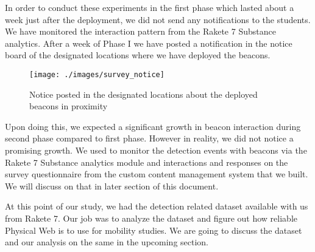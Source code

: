 In order to conduct these experiments in the first phase which lasted about a week just after the deployment, we did not send any notifications to the students. We have monitored the interaction pattern from the Rakete 7 Substance\cite{Rakete7Substance} analytics.
After a week of Phase I we have posted a notification in the notice board of the designated locations where we have deployed the beacons.

\begin{figure}[H]
	\centering
	\texttt{[image: ./images/survey\_notice]}
	\caption{Notice posted in the designated locations about the deployed beacons in proximity}
	\label{figure1:survey_notice_beacons_deployed}
\end{figure}

Upon doing this, we expected a significant growth in beacon interaction during second phase compared to first phase. However in reality, we did not notice a promising growth. We used to monitor the detection events with beacons via the Rakete 7 Substance\cite{Rakete7Substance} analytics module and interactions and responses on the survey questionnaire from the custom content management system that we built. We will discuss on that in later section of this document.

At this point of our study, we had the detection related dataset available with us from Rakete 7\cite{Rakete7}. Our job was to analyze the dataset and figure out how reliable Physical Web is to use for mobility studies. We are going to discuss the dataset and our analysis on the same in the upcoming section.